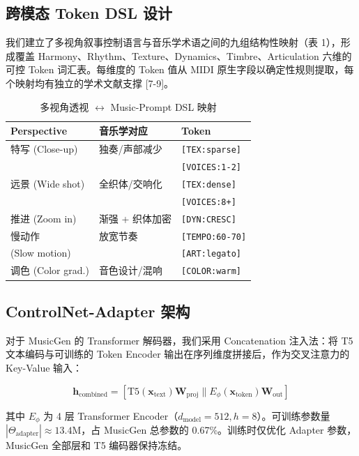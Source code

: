 \documentclass[twocolumn, a4paper, 10pt]{ctexart}
\begin{document}
\subsection{跨模态 Token DSL 设计}

我们建立了多视角叙事控制语言与音乐学术语之间的九组结构性映射（表 1），形成覆盖 Harmony、Rhythm、Texture、Dynamics、Timbre、Articulation 六维的可控 Token 词汇表。每维度的 Token 值从 MIDI 原生字段以确定性规则提取，每个映射均有独立的学术文献支撑 [7-9]。

\begin{table}[H]
    \centering
    \caption{多视角透视 $\leftrightarrow$ Music-Prompt DSL 映射}
    \small
    \begin{tabular}{lll}
    \toprule
    \textbf{Perspective} & \textbf{音乐学对应} & \textbf{Token} \\
    \midrule
    特写 (Close-up) & 独奏/声部减少 & \texttt{[TEX:sparse]} \\
    & & \texttt{[VOICES:1-2]} \\
    远景 (Wide shot) & 全织体/交响化 & \texttt{[TEX:dense]} \\
    & & \texttt{[VOICES:8+]} \\
    推进 (Zoom in) & 渐强 + 织体加密 & \texttt{[DYN:CRESC]} \\
    慢动作 & 放宽节奏 & \texttt{[TEMPO:60-70]} \\
    (Slow motion) & & \texttt{[ART:legato]} \\
    调色 (Color grad.) & 音色设计/混响 & \texttt{[COLOR:warm]} \\
    \bottomrule
    \end{tabular}
\end{table}

\subsection{ControlNet-Adapter 架构}

对于 MusicGen 的 Transformer 解码器，我们采用 Concatenation 注入法：将 T5 文本编码与可训练的 Token Encoder 输出在序列维度拼接后，作为交叉注意力的 Key-Value 输入：

\begin{equation}
\mathbf{h}_{\text{combined}} = [ \text{T5}(\mathbf{x}_{\text{text}})\mathbf{W}_{\text{proj}} \parallel E_\phi(\mathbf{x}_{\text{token}})\mathbf{W}_{\text{out}} ]
\end{equation}

其中 $E_\phi$ 为 4 层 Transformer Encoder（$d_{\text{model}} = 512, h = 8$）。可训练参数量 $|\Theta_{\text{adapter}}| \approx 13.4\text{M}$，占 MusicGen 总参数的 0.67\%。训练时仅优化 Adapter 参数，MusicGen 全部层和 T5 编码器保持冻结。
\end{document}
